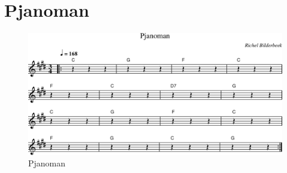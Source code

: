 \chapter{Pjanoman}



\begin{figure}[!htbp]
  \includegraphics[width=\textwidth,height=\textheight,keepaspectratio]{../songs/62_pjanoman.png}
  \caption{Pjanoman}
  \label{fig:62_pjanoman}
\end{figure}
